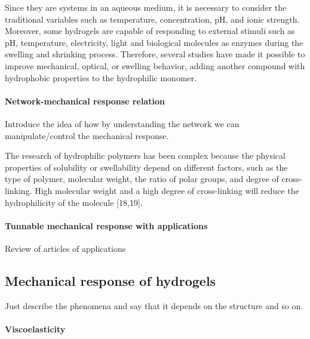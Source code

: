 Since they are systems in an aqueous medium, it is necessary to consider the traditional variables such as temperature, concentration, pH, and ionic strength\citep{bustamante-torresHydrogelsClassificationAccording2021}. 
Moreover, some hydrogels are capable of responding to external stimuli such as pH, temperature, electricity, light and biological molecules as enzymes during the swelling and shrinking process\citep{bustamante-torresHydrogelsClassificationAccording2021}. 
Therefore, several studies have made it possible to improve mechanical, optical, or swelling behavior, adding another compound with hydrophobic properties to the hydrophilic monomer\citep{bustamante-torresHydrogelsClassificationAccording2021}. 



\paragraph{Network-mechanical response relation} Introduce the idea of how by understanding the network we can manipulate/control the mechanical response.

The research of hydrophilic polymers has been complex because the physical properties of solubility or swellability depend on different factors, such as the type of polymer, molecular weight, the ratio of polar groups, and degree of cross-linking\citep{bustamante-torresHydrogelsClassificationAccording2021}.
High molecular weight and a high degree of cross-linking will reduce the hydrophilicity of the molecule [18,19]\citep{bustamante-torresHydrogelsClassificationAccording2021}. 


\paragraph{Tunnable mechanical response with applications} Review of articles of applications 

\subsection{Mechanical response of hydrogels}\label{ch1:Cross-linking}

Just describe the phenomena and say that it depends on the structure and so on.

\paragraph{Viscoelasticity}

